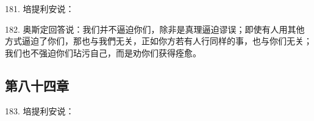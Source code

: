 181. 培提利安说：\par

182. 奥斯定回答说：我们并不逼迫你们，除非是真理逼迫谬误；即使有人用其他方式逼迫了你们，那也与我們无关，正如你方若有人行同样的事，也与你们无关；我们也不强迫你们玷污自己，而是劝你们获得痊愈。\par


\subsection{第八十四章}

183. 培提利安说：\par

